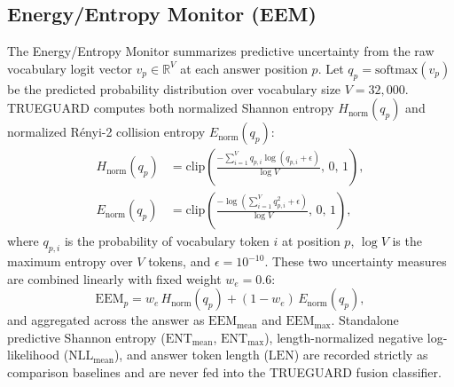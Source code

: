 \documentclass{ieeeaccess}
\begin{document}
\subsection{Energy/Entropy Monitor (EEM)}
The Energy/Entropy Monitor summarizes predictive uncertainty from the raw vocabulary logit vector $v_p \in \mathbb{R}^{V}$ at each answer position $p$. Let $q_p = \text{softmax}(v_p)$ be the predicted probability distribution over vocabulary size $V = 32{,}000$. TRUEGUARD computes both normalized Shannon entropy $H_{\text{norm}}(q_p)$ and normalized R\'enyi-2 collision entropy $E_{\text{norm}}(q_p)$:
\begin{equation}
\begin{aligned}
H_{\text{norm}}(q_p) &= \text{clip}\!\left(\frac{-\sum_{i=1}^{V} q_{p,i} \log(q_{p,i} + \epsilon)}{\log V},\, 0,\, 1\right), \\
E_{\text{norm}}(q_p) &= \text{clip}\!\left(\frac{-\log\!\left(\sum_{i=1}^{V} q_{p,i}^2 + \epsilon\right)}{\log V},\, 0,\, 1\right),
\end{aligned}
\label{eq:eem_parts}
\end{equation}
where $q_{p,i}$ is the probability of vocabulary token $i$ at position $p$, $\log V$ is the maximum entropy over $V$ tokens, and $\epsilon = 10^{-10}$. These two uncertainty measures are combined linearly with fixed weight $w_e = 0.6$:
\begin{equation}
\text{EEM}_p = w_e\, H_{\text{norm}}(q_p) + (1 - w_e)\, E_{\text{norm}}(q_p),
\label{eq:eem}
\end{equation}
and aggregated across the answer as $\text{EEM}_{\text{mean}}$ and $\text{EEM}_{\text{max}}$. Standalone predictive Shannon entropy ($\text{ENT}_{\text{mean}}$, $\text{ENT}_{\text{max}}$), length-normalized negative log-likelihood ($\text{NLL}_{\text{mean}}$), and answer token length ($\text{LEN}$) are recorded strictly as comparison baselines and are never fed into the TRUEGUARD fusion classifier.
\end{document}

